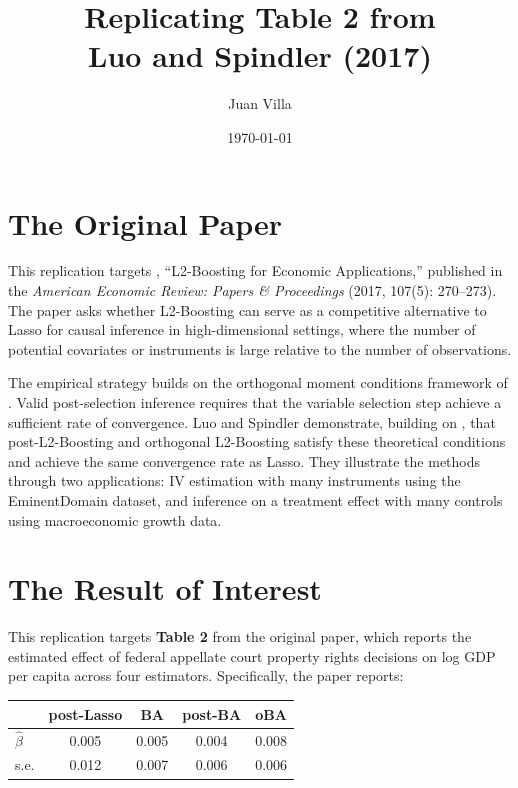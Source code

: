 \documentclass[12pt]{article}
\title{Replicating Table 2 from \\ Luo and Spindler (2017)}
\author{Juan Villa}
\date{\today}
\begin{document}
\maketitle

\section{The Original Paper}

This replication targets \citet{luo2017l2boosting}, ``L2-Boosting for Economic
Applications,'' published in the \textit{American Economic Review: Papers \&
Proceedings} (2017, 107(5): 270--273). The paper asks whether L2-Boosting can serve as a competitive alternative to
Lasso for causal inference in high-dimensional settings, where the number of
potential covariates or instruments is large relative to the number of
observations.

The empirical strategy builds on the orthogonal moment conditions framework
of \citet{chernozhukov2016double}. Valid post-selection inference requires
that the variable selection step achieve a sufficient rate of convergence.
Luo and Spindler demonstrate, building on \citet{luo2016highdim}, that
post-L2-Boosting and orthogonal L2-Boosting satisfy these theoretical
conditions and achieve the same convergence rate as Lasso. They illustrate
the methods through two applications: IV estimation with many instruments
using the EminentDomain dataset, and inference on a treatment effect with
many controls using macroeconomic growth data.

\section{The Result of Interest}

This replication targets \textbf{Table 2} from the original paper, which
reports the estimated effect of federal appellate court property rights
decisions on log GDP per capita across four estimators. Specifically, the
paper reports:

\begin{center}
\begin{tabular}{lcccc}
\hline
 & post-Lasso & BA & post-BA & oBA \\
\hline
$\hat{\beta}$ & 0.005 & 0.005 & 0.004 & 0.008 \\
s.e.          & 0.012 & 0.007 & 0.006 & 0.006 \\
\hline
\end{tabular}
\end{center}
\end{document}
